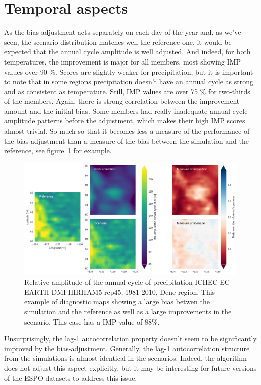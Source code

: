 \documentclass[letterpaper,10pt]{article}
\begin{document}
\section{Temporal aspects}
As the bias adjustment acts separately on each day of the year and, as we've seen, the scenario distribution matches well the reference one, it would be expected that the annual cycle amplitude is well adjusted. And indeed, for both temperatures, the improvement is major for all members, most showing IMP values over 90 \%. Scores are slightly weaker for precipitation, but it is important to note that in some regions precipitation doesn't have an annual cycle as strong and as consistent as temperature. Still, IMP values are over 75 \% for two-thirds of the members. Again, there is strong correlation between the improvement amount and the initial bias. Some members had really inadequate annual cycle amplitude patterns before the adjustment, which makes their high IMP scores almost trivial. So much so that it becomes less a measure of the performance of the bias adjustment than a measure of the bias between the simulation and the reference, see figure~\ref{fig:acapr} for example.

\begin{figure}
\includegraphics[width=\textwidth]{../images/aca_pr_diags.pdf}
\caption{Relative amplitude of the annual cycle of precipitation ICHEC-EC-EARTH DMI-HIRHAM5 rcp45, 1981-2010, Dene region. This example of diagnostic maps showing a large bias betwen the simulation and the reference as well as a large improvements in the scenario. This case has a IMP value of 88\%.}\label{fig:acapr}
\end{figure}


Unsurprisingly, the lag-1 autocorrelation property doesn't seem to be significantly improved by the bias-adjustment. Generally, the lag-1 autocorrelation structure from the simulations is almost identical in the scenarios. Indeed, the algorithm does not adjust this aspect explicitly, but it may be interesting for future versions of the ESPO datasets to address this issue.
\end{document}

